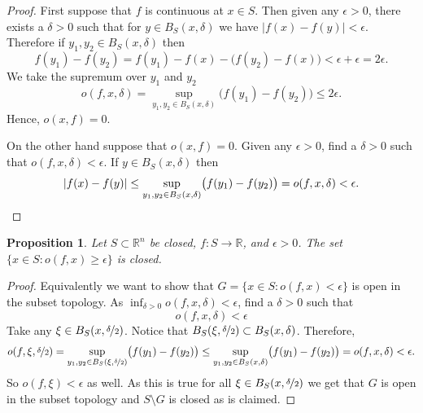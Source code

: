 \documentclass[12pt]{book}
\newcommand{\abs}[1]{\left\lvert {#1} \right\rvert}
\newcommand{\R}{{\mathbb{R}}}
\theoremstyle{plain}
\newtheorem{prop}[thm]{Proposition}
\theoremstyle{remark}
\theoremstyle{definition}
\theoremstyle{exercise}
\theoremstyle{example}
\begin{document}
\begin{proof}
First suppose that $f$ is continuous at $x \in S$.  Then given any $\epsilon > 0$,
there exists a $\delta > 0$ such that for $y \in B_S(x,\delta)$
we have $\abs{f(x)-f(y)} < \epsilon$.  Therefore if $y_1,y_2 \in
B_S(x,\delta)$ then
\begin{equation*}
f(y_1)-f(y_2) =
f(y_1)-f(x)-\bigl(f(y_2)-f(x)\bigr) < \epsilon + \epsilon = 2 \epsilon .
\end{equation*}
We take the supremum over $y_1$ and $y_2$
\begin{equation*}
o(f,x,\delta) = 
\sup_{y_1,y_2 \in B_S(x,\delta)} \bigl(f(y_1)-f(y_2)\bigr)
\leq
2 \epsilon .
\end{equation*}
Hence, $o(x,f) = 0$.

On the other hand suppose that $o(x,f) = 0$.  Given any $\epsilon > 0$,
find a $\delta > 0$ such that $o(f,x,\delta) < \epsilon$.  If
$y \in B_S(x,\delta)$ then
\begin{equation*}
\abs{f(x)-f(y)}
\leq
\sup_{y_1,y_2 \in B_S(x,\delta)} \bigl(f(y_1)-f(y_2)\bigr)
=
o(f,x,\delta) < \epsilon. \qedhere
\end{equation*}
\end{proof}

\begin{prop} \label{prop:seclosed}
Let $S \subset \R^n$ be closed,
$f \colon S \to \R$, and $\epsilon > 0$.
The set $\{ x \in S : o(f,x) \geq \epsilon \}$ is closed.
\end{prop}

\begin{proof}
Equivalently we want to show that
$G = \{ x \in S : o(f,x) < \epsilon \}$ is open in the subset topology.
As $\inf_{\delta > 0} o(f,x,\delta) < \epsilon$, find a $\delta > 0$ such
that
\begin{equation*}
o(f,x,\delta) < \epsilon
\end{equation*}
Take any $\xi \in B_S(x,\nicefrac{\delta}{2})$.  Notice that
$B_S(\xi,\nicefrac{\delta}{2}) \subset B_S(x,\delta)$.  Therefore,
\begin{equation*}
o(f,\xi,\nicefrac{\delta}{2}) =
\sup_{y_1,y_2 \in B_S(\xi,\nicefrac{\delta}{2})} \bigl(f(y_1)-f(y_2)\bigr) 
\leq
\sup_{y_1,y_2 \in B_S(x,\delta)} \bigl(f(y_1)-f(y_2)\bigr) = o(f,x,\delta) <
\epsilon .
\end{equation*}
So $o(f,\xi) < \epsilon$ as well.  As this is true for all $\xi \in
B_S(x,\nicefrac{\delta}{2})$ we get that $G$ is open in the subset
topology and $S \setminus G$ is closed as is claimed.
\end{proof}
\end{document}
